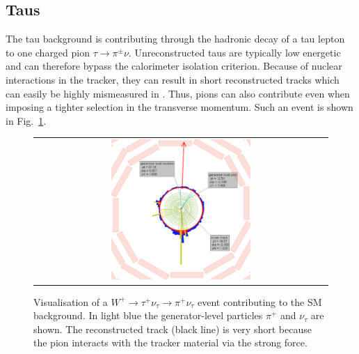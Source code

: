 \subsection*{Taus}
The tau background is contributing through the hadronic decay of a tau lepton to one charged pion $\tau\rightarrow\pi^{\pm}\nu$.
Unreconstructed taus are typically low energetic and can therefore bypass the calorimeter isolation criterion.
Because of nuclear interactions in the tracker, they can result in short reconstructed tracks which can easily be highly mismeasured in \pt.
Thus, pions can also contribute even when imposing a tighter selection in the transverse momentum.
Such an event is shown in Fig.~\ref{fig:LostTau}.
\begin{figure}[!tb]
  \centering 
  \begin{tabular}{c}
    \includegraphics[width=0.49\textwidth]{figures/analysis/LostTau_Lumi_60133_Event_24033837.png}
  \end{tabular}
  \caption{Visualisation of a $W^{+}\rightarrow \tau^{+}\nu_{\tau} \rightarrow \pi^{+} \nu_{\tau}$ event contributing to the SM background. 
           In light blue the generator-level particles $\pi^{+}$ and $\nu_{\tau}$ are shown.
           The reconstructed track (black line) is very short because the pion interacts with the tracker material via the strong force.}
  \label{fig:LostTau}
\end{figure}

